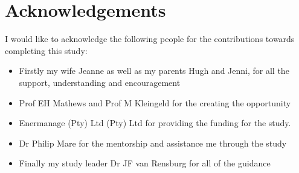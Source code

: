 \documentclass[12pt, english, oneside]{report}%
\renewcommand{\arraystretch}{1.4}
\begin{document}
{\tiny }\section*{Acknowledgements}
\thispagestyle{plain}
\vspace{0.2cm}
I would like to acknowledge the following people for the contributions towards completing this study:
\begin{itemize}
	\item Firstly my wife Jeanne as well as my parents Hugh and Jenni,  for all the support, understanding and encouragement 
	\item Prof EH Mathews and Prof M Kleingeld for the creating the opportunity
	\item Enermanage (Pty) Ltd (Pty) Ltd for providing the funding for the study.
	\item Dr Philip Mare for the mentorship and assistance me through the study
	\item Finally my study leader Dr JF van Rensburg for all of the guidance  
\end{itemize}

\clearpage

\tableofcontents

\clearpage

\renewcommand{\arraystretch}{1.2}
\linespread{1}
	\printglossary[type=\acronymtype]
	\newpage
	\printglossary[title=Nomenclature]
	\newpage
\renewcommand{\arraystretch}{1.4}
\linespread{1.4}

	\listoffigures
	\clearpage
	\listoftables









\glsaddall
\end{document}
